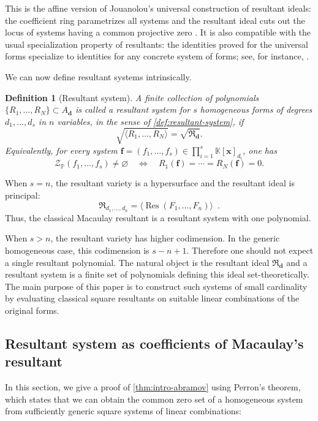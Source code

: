 \documentclass[11pt,a4paper]{article}
\newcommand{\ideal}[1]{\langle #1 \rangle}
\newtheorem{definition}[theorem]{Definition}\AddToHook{env/definition/begin}{\crefalias{theorem}{definition}}
\numberwithin{equation}{section}
\newcommand{\PP}{\mathbb{P}}
\newcommand{\KK}{\mathbb{K}}
\newcommand{\cZ}{\mathcal{Z}}
\newcommand{\xx}{\ensuremath{\boldsymbol{x}}}
\newcommand{\ff}{\ensuremath{\boldsymbol{f}}}
\newcommand{\dd}{\mathbf{d}}
\DeclareMathOperator{\Res}{Res}
\begin{document}
This is the affine version of Jouanolou's universal construction of resultant
ideals: the coefficient ring parametrizes all systems and the resultant ideal cuts
out the locus of systems having a common projective zero
\cite{Jouanolou-80,Jouanolou-91}. It is also compatible with the usual
specialization property of resultants: the identities proved for the universal forms
specialize to identities for any concrete system of forms; see, for instance,
\cite[Chapter~6]{Buse-21}.

We can now define resultant systems intrinsically.

\begin{definition}[Resultant system]
\label{def:resultant-system-intrinsic}
A finite collection of polynomials $\{R_1,\ldots,R_N \} \subset A_{\dd}$
is called a resultant system for $s$ homogeneous forms of degrees
$d_1,\ldots,d_s$ in $n$ variables,
in the sense of \cref{def:resultant-system},  if
\[ 
	\sqrt{\ideal{R_1,\ldots,R_N}}= \sqrt{\mathfrak R_{\dd}}.
\]
Equivalently, for every system
$\ff=(f_1,\ldots,f_s)\in \prod_{i=1}^s\KK[\xx]_{d_i}$, one has
\[
	\cZ_{\PP}(f_1,\ldots,f_s)\neq\varnothing
	\quad\Longleftrightarrow\quad
	R_1(\ff)=\cdots=R_N(\ff)=0.
\]
\end{definition}

When $s=n$, the resultant variety is a hypersurface and the resultant ideal is
principal:
\[
	\mathfrak R_{d_1,\ldots,d_n} = 
	\ideal{\Res(F_1,\ldots,F_n)} \enspace.
\]
Thus, the classical Macaulay resultant is a resultant system with one polynomial.

When $s>n$, the resultant variety has higher codimension. In the generic
homogeneous case, this codimension is $s-n+1$. Therefore one should not expect a
single resultant polynomial. The natural object is the resultant ideal
$\mathfrak R_{\dd}$ and a resultant system is a finite set of polynomials
defining this ideal set-theoretically. The main purpose of this paper is to construct
 such systems of small cardinality by evaluating classical square resultants on suitable linear
combinations of the original forms.


\subsection{Resultant system as coefficients of Macaulay's resultant}
\label{sec:prelim-system}
In this section, we give a proof of \cref{thm:intro-abramov} using Perron's theorem, which states that we can obtain the common zero set of a homogeneous system 
from sufficiently generic square systems of linear combinations:
\end{document}
